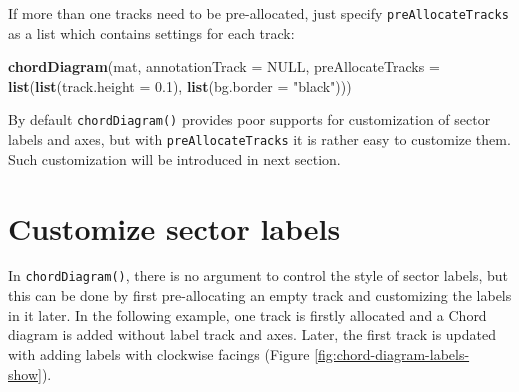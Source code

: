 \documentclass[]{book}
\newenvironment{Shaded}{\begin{snugshade}}{\end{snugshade}}
\newcommand{\KeywordTok}[1]{\textcolor[rgb]{0.13,0.29,0.53}{\textbf{#1}}}
\newcommand{\DataTypeTok}[1]{\textcolor[rgb]{0.13,0.29,0.53}{#1}}
\newcommand{\DecValTok}[1]{\textcolor[rgb]{0.00,0.00,0.81}{#1}}
\newcommand{\FloatTok}[1]{\textcolor[rgb]{0.00,0.00,0.81}{#1}}
\newcommand{\StringTok}[1]{\textcolor[rgb]{0.31,0.60,0.02}{#1}}
\newcommand{\CommentTok}[1]{\textcolor[rgb]{0.56,0.35,0.01}{\textit{#1}}}
\newcommand{\OtherTok}[1]{\textcolor[rgb]{0.56,0.35,0.01}{#1}}
\newcommand{\ControlFlowTok}[1]{\textcolor[rgb]{0.13,0.29,0.53}{\textbf{#1}}}
\newcommand{\OperatorTok}[1]{\textcolor[rgb]{0.81,0.36,0.00}{\textbf{#1}}}
\newcommand{\NormalTok}[1]{#1}
\theoremstyle{definition}
\theoremstyle{definition}
\theoremstyle{remark}
\begin{document}
If more than one tracks need to be pre-allocated, just specify
\texttt{preAllocateTracks} as a list which contains settings for each
track:

\begin{Shaded}
\begin{Highlighting}[]
\KeywordTok{chordDiagram}\NormalTok{(mat, }\DataTypeTok{annotationTrack =} \OtherTok{NULL}\NormalTok{,}
    \DataTypeTok{preAllocateTracks =} \KeywordTok{list}\NormalTok{(}\KeywordTok{list}\NormalTok{(}\DataTypeTok{track.height =} \FloatTok{0.1}\NormalTok{),}
                             \KeywordTok{list}\NormalTok{(}\DataTypeTok{bg.border =} \StringTok{"black"}\NormalTok{)))}
\end{Highlighting}
\end{Shaded}

By default \texttt{chordDiagram()} provides poor supports for
customization of sector labels and axes, but with
\texttt{preAllocateTracks} it is rather easy to customize them. Such
customization will be introduced in next section.

\section{Customize sector labels}\label{customize-sector-labels}

In \texttt{chordDiagram()}, there is no argument to control the style of
sector labels, but this can be done by first pre-allocating an empty
track and customizing the labels in it later. In the following example,
one track is firstly allocated and a Chord diagram is added without
label track and axes. Later, the first track is updated with adding
labels with clockwise facings (Figure
\ref{fig:chord-diagram-labels-show}).

\begin{Shaded}
\end{Shaded}
\end{document}
